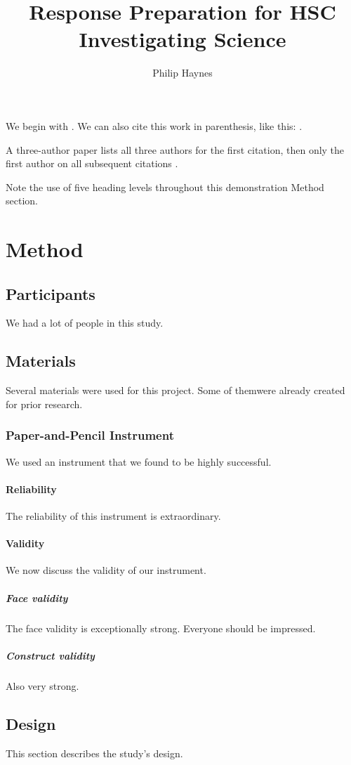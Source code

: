 \documentclass[jou]{apa7}
\title{Response Preparation for HSC Investigating Science}
\author{Philip Haynes}
\affiliation{Gosford High School}
\begin{document}
\maketitle
We begin with \textcite{Shotton1989}.  We can also cite this work in
parenthesis, like this: \parencite{Shotton1989}.

A three-author paper \parencite[e.g.,][]{Lassen2006} lists all
three authors for the first citation, then only the first author
on all subsequent citations \parencite{Lassen2006}.

Note the use of five heading levels throughout this demonstration
Method section.

\section{Method}
\subsection{Participants}
We had a lot of people in this study.

\subsection{Materials}
Several materials were used for this project.  Some of themwere
already created for prior research.

\subsubsection{Paper-and-Pencil Instrument}
We used an instrument that we found to be highly successful.

\paragraph{Reliability}
The reliability of this instrument is extraordinary.

\paragraph{Validity}
We now discuss the validity of our instrument.

\subparagraph{Face validity} The face validity is exceptionally
strong.  Everyone should be impressed.

\subparagraph{Construct validity} Also very strong.

\subsection{Design}
This section describes the study's design.
\end{document}
